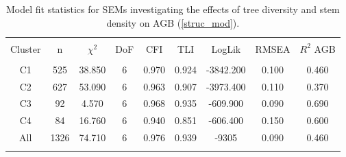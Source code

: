 
\begin{table}[!htbp] \centering 
  \caption{Model fit statistics for SEMs investigating the effects of tree diversity and stem density on AGB (\autoref{struc_mod}).} 
  \label{struc_model_fit_clust_stats} 
\begin{tabular}{@{\extracolsep{0pt}} ccccccccc} 
\\[-1.8ex]\hline 
\hline \\[-1.8ex] 
{Cluster} & {n} & {$\chi^{2}$} & {DoF} & {CFI} & {TLI} & {LogLik} & {RMSEA} & {$R^{2}$ AGB} \\
\hline \\[-1.8ex] 
C1 & 525 & 38.850 & 6 & 0.970 & 0.924 & -3842.200 & 0.100 & 0.460 \\ 
C2 & 627 & 53.090 & 6 & 0.963 & 0.907 & -3973.400 & 0.110 & 0.370 \\ 
C3 & 92 & 4.570 & 6 & 0.968 & 0.935 & -609.900 & 0.090 & 0.690 \\
C4 & 84 & 16.760 & 6 & 0.940 & 0.851 & -606.400 & 0.150 & 0.600 \\ 
All & 1326 & 74.710 & 6 & 0.976 & 0.939 & -9305 & 0.090 & 0.460 \\ 
\hline \\[-1.8ex] 
\end{tabular} 
\end{table} 
